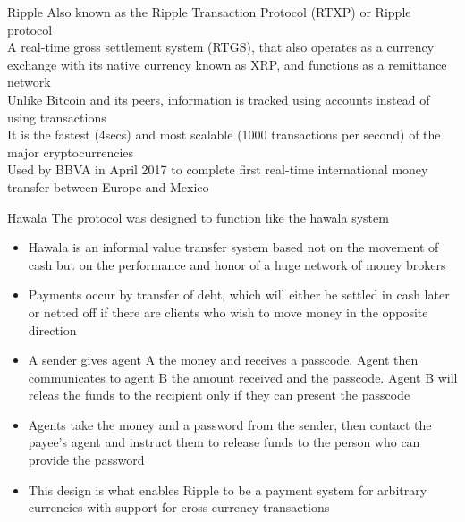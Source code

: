 \documentclass[11pt]{beamer}
\begin{document}

\begin{frame}{Ripple}
	Also known as the Ripple Transaction Protocol (RTXP) or Ripple protocol\\ \vspace{3mm}
	A real-time gross settlement system (RTGS), that also operates as a currency exchange with its native currency known as XRP, and functions as a remittance network\\ \vspace{3mm}
	Unlike Bitcoin and its peers, information is tracked using accounts instead of using transactions\\ \vspace{3mm}
	It is the fastest (4secs) and most scalable (1000 transactions per second) of the major cryptocurrencies\\ \vspace{3mm}
	Used by BBVA in April 2017 to complete first real-time international money transfer between Europe and Mexico
\end{frame}


\begin{frame}{Hawala}
	The protocol was designed to function like the hawala system
	\begin{itemize}
		\item Hawala is an informal value transfer system based not on the movement of cash but on the performance and honor of a huge network of money brokers
		\item Payments occur by transfer of debt, which will either be settled in cash later or netted off if there are clients who wish to move money in the opposite direction
		\item A sender gives agent A the money and receives a passcode. Agent then communicates to agent B the amount received and the passcode. Agent B will releas the funds to the recipient only if they can present the passcode
		\item Agents take the money and a password from the sender, then contact the payee's agent and instruct them to release funds to the person who can provide the password
		\item This design is what enables Ripple to be a payment system for arbitrary currencies with support for cross-currency transactions
	\end{itemize}
\end{frame}
\end{document}
